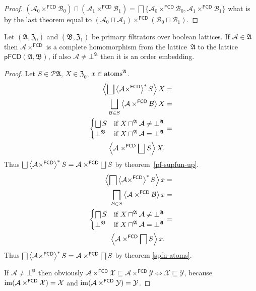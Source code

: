 \begin{proof}
$(\mathcal{A}_{0}\times^{\mathsf{FCD}}\mathcal{B}_{0})\sqcap(\mathcal{A}_{1}\times^{\mathsf{FCD}}\mathcal{B}_{1})=\bigsqcap\{\mathcal{A}_{0}\times^{\mathsf{FCD}}\mathcal{B}_{0},\mathcal{A}_{1}\times^{\mathsf{FCD}}\mathcal{B}_{1}\}$
what is by the last theorem equal to $(\mathcal{A}_{0}\sqcap\mathcal{A}_{1})\times^{\mathsf{FCD}}(\mathcal{B}_{0}\sqcap\mathcal{B}_{1})$.\end{proof}
\begin{thm}
Let $(\mathfrak{A},\mathfrak{Z}_{0})$ and $(\mathfrak{B},\mathfrak{Z}_{1})$
be primary filtrators over boolean lattices. If $\mathcal{A}\in\mathfrak{A}$
then $\mathcal{A}\times^{\mathsf{FCD}}$ is a complete homomorphism
from the lattice~$\mathfrak{A}$ to the lattice $\mathsf{pFCD}(\mathfrak{A},\mathfrak{B})$,
if also $\mathcal{A}\neq\bot^{\mathfrak{A}}$ then it is an order
embedding.\end{thm}
\begin{proof}
Let $S\in\mathscr{P}\mathfrak{A}$, $X\in\mathfrak{Z}_{0}$, $x\in\operatorname{atoms}^{\mathfrak{A}}$.
\begin{align*}
\supfun{\bigsqcup\rsupfun{\mathcal{A}\times^{\mathsf{FCD}}}S}X & =\\
\bigsqcup_{\mathcal{B}\in S}\supfun{\mathcal{A}\times^{\mathsf{FCD}}\mathcal{B}}X & =\\
\begin{cases}
\bigsqcup S & \text{if }X\sqcap^{\mathfrak{A}}\mathcal{A}\ne\bot^{\mathfrak{A}}\\
\bot^{\mathfrak{B}} & \text{if }X\sqcap^{\mathfrak{A}}\mathcal{A}=\bot^{\mathfrak{A}}
\end{cases} & =\\
\supfun{\mathcal{A}\times^{\mathsf{FCD}}\bigsqcup S}X.
\end{align*}
Thus $\bigsqcup\rsupfun{\mathcal{A}\times^{\mathsf{FCD}}}S=\mathcal{A}\times^{\mathsf{FCD}}\bigsqcup S$
by theorem~\ref{pf-supfun-up}.
\begin{align*}
\left\langle \bigsqcap\left\langle \mathcal{A}\times^{\mathsf{FCD}}\right\rangle ^{\ast}S\right\rangle x & =\\
\bigsqcap_{\mathcal{B}\in S}\left\langle \mathcal{A}\times^{\mathsf{FCD}}\mathcal{B}\right\rangle x & =\\
\begin{cases}
\bigsqcap S & \text{if }X\sqcap^{\mathfrak{A}}\mathcal{A}\ne\bot^{\mathfrak{A}}\\
\bot^{\mathfrak{B}} & \text{if }X\sqcap^{\mathfrak{A}}\mathcal{A}=\bot^{\mathfrak{A}}
\end{cases} & =\\
\left\langle \mathcal{A}\times^{\mathsf{FCD}}\bigsqcap S\right\rangle x.
\end{align*}
Thus $\bigsqcap\left\langle \mathcal{A}\times^{\mathsf{FCD}}\right\rangle ^{\ast}S=\mathcal{A}\times^{\mathsf{FCD}}\bigsqcap S$
by theorem \ref{spfn-atoms}.

If $\mathcal{A}\neq\bot^{\mathfrak{A}}$ then obviously
$\mathcal{A}\times^{\mathsf{FCD}}\mathcal{X}\sqsubseteq\mathcal{A}\times^{\mathsf{FCD}}\mathcal{Y} \Leftrightarrow
\mathcal{X}\sqsubseteq\mathcal{Y}$, because $\operatorname{im}(\mathcal{A}\times^{\mathsf{FCD}}\mathcal{X})=\mathcal{X}$ and
$\operatorname{im}(\mathcal{A}\times^{\mathsf{FCD}}\mathcal{Y})=\mathcal{Y}$.\end{proof}

